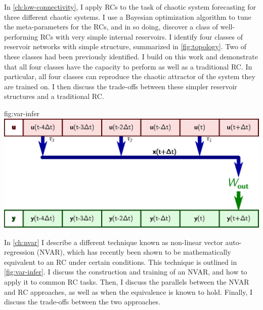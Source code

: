 In \cref{ch:low-connectivity}, I apply RCs to the task of chaotic
system forecasting for three different chaotic systems. I use a
Bayesian optimization algorithm to tune the meta-parameters for the
RCs, and in so doing, discover a class of well-performing RCs with very
simple internal reservoirs. I identify four classes of reservoir
networks with simple structure, summarized in \cref{fig:topology}. Two of these classes had been
previously identified. I build on this work and demonstrate that all
four classes have the capacity to perform as well as a traditional
RC. In particular, all four classes can reproduce the chaotic
attractor of the system they are trained on. I then discuss the
trade-offs between these simpler reservoir structures and a
traditional RC.

\begin{reusefigure}{fig:var-infer}
  \includegraphics{figures/var-infer}
  \caption{Summary of the VAR method. Many time-delay taps $\tau_i$ of
    the signal $\bm{u}(t)$ (top, red) is collected into the tap vector
    $\bm{x}(t)$ (middle, blue). Here, there are three taps $\tau_0=0$,
    $\tau_1=2$, and $\tau_2=4$. These taps are then combined linearly
    by the output matrix $W_\text{out}$ to produce the next value of
    the VAR's output $\bm{y}(t)$ (bottom, green). To transform a whole
    time series input, this VAR process slides along the time axis
    from left to right.}
\end{reusefigure}

In \cref{ch:nvar} I describe a different technique known as
non-linear vector auto-regression (NVAR), which has recently been shown
to be mathematically equivalent to an RC under certain conditions.
This technique is outlined in \cref{fig:var-infer}.
I discuss the construction and training of an NVAR, and how to apply it
to common RC tasks. Then, I discuss the parallels between the NVAR
and RC approaches, as well as when the equivalence is known to
hold. Finally, I discuss the trade-offs between the two approaches.

